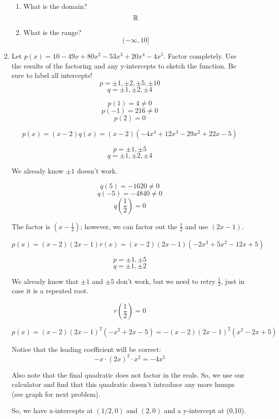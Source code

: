 \documentclass[letterpaper,12pt,fleqn]{article}
\begin{document}
\begin{enumerate}
\begin{enumerate}
\item What is the domain?
\[\mathbb{R}\]

\item What is the range?
\[(-\infty,10]\]
\end{enumerate}

\item Let $p(x)=10-49x+80x^2-53x^3+20x^4-4x^5$. Factor completely. Use the
results of the factoring and any y-intercepts to sketch the function. Be sure
to label all intercepts!
\[p=\pm1,\pm2,\pm5,\pm10\]
\[q=\pm1,\pm2,\pm4\]

\[p(1)=4\ne0\]
\[p(-1)=216\ne0\]
\[p(2)=0\]


\[p(x)=(x-2)q(x)=(x-2)(-4x^4+12x^3-29x^2+22x-5)\]

\[p=\pm1,\pm5\]
\[q=\pm1,\pm2,\pm4\]

We already know $\pm1$ doesn't work.

\[q(5)=-1620\ne0\]
\[q(-5)=-4840\ne0\]
\[q\left(\frac{1}{2}\right)=0\]

The factor is $\left(x-\frac{1}{2}\right)$; however, we can factor out the
$\frac{1}{2}$ and use $(2x-1)$.


\[p(x)=(x-2)(2x-1)r(x)=(x-2)(2x-1)(-2x^3+5x^2-12x+5)\]

\[p=\pm1,\pm5\]
\[q=\pm1,\pm2\]

We already know that $\pm1$ and $\pm5$ don't work, but we need to retry
$\frac{1}{2}$, just in case it is a repeated root.

\[r\left(\frac{1}{2}\right)=0\]


\[p(x)=(x-2)(2x-1)^2(-x^2+2x-5)=-(x-2)(2x-1)^2(x^2-2x+5)\]

Notice that the leading coefficient will be correct:
\[-x\cdot(2x)^2\cdot x^2=-4x^5\]

Also note that the final quadratic does not factor in the reals. So, we use
our calculator and find that this quadratic doesn't introduce any more humps
(see graph for next problem).

So, we have x-intercepts at $(1/2,0)$ and $(2,0)$ and a y-intercept at (0,10).



\end{enumerate}
\end{document}
